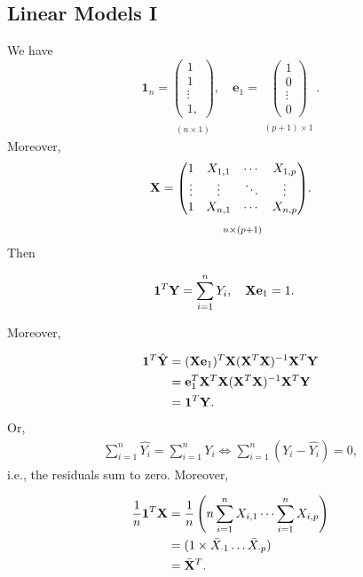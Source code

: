 \subsection{Linear Models I}
\begin{remark}
We have
\[
		\mathbf 1_n=\underset{\substack{\\ (n\times 1)}}{\begin{pmatrix} 1 \\ 1 \\ \vdots \\ 1, \end{pmatrix}}, \quad \mathbf e_1= \underset{\substack{\\ (p+1)\times 1}}{\begin{pmatrix} 1 \\ 0 \\ \vdots \\ 0 \end{pmatrix}} 
.\]
Moreover,
\[\mathbf X=
		\underset{\substack{\\ \\ n\times(p+1)}}{\begin{pmatrix} 1 & X_{1,1} &\cdots & X_{1,p} \\ \vdots &\vdots &\ddots &\vdots \\ 1 & X_{n,1} &\cdots &X_{n,p} \end{pmatrix}}
.\] 
Then

\begin{align*}
	&\mathbf 1^T\mathbf Y=\sum^n_{i=1}Y_i, \quad \mathbf X \mathbf e_1=1
.\end{align*}

Moreover,

\begin{align*}
	\mathbf 1^T \hat{\mathbf Y} 
	&= (\mathbf X\mathbf e_1)^T \mathbf X(\mathbf X^T\mathbf X)^{-1} \mathbf X^T\mathbf Y \\
	&= \mathbf e_1^T \mathbf X^T\mathbf X(\mathbf X^T\mathbf X)^{-1}\mathbf X^T\mathbf Y\\
	&= \mathbf 1^T \mathbf Y
.\end{align*}
Or, 
\begin{align*}
	\sum_{i=1}^{n} \hat{Y_i}=\sum_{i=1}^nY_i \iff \sum^n_{i=1} \left(Y_i-\hat{Y_i} \right) =0
,\end{align*}
i.e., the residuals sum to zero. Moreover,

\begin{align*}
	\frac{1}{n}\mathbf 1^T\mathbf X 
	&=\frac{1}{n}\left( n\sum^n_{i=1}X_{i,1} \cdots \sum^n_{i=1}X_{i,p}  \right) \\
	&= (1\times  \bar{X}_{\cdot 1}\ldots \bar{X}_{\cdot p}) \\
	&= \bar{\mathbf X}^T 
.\end{align*}


\end{remark}
